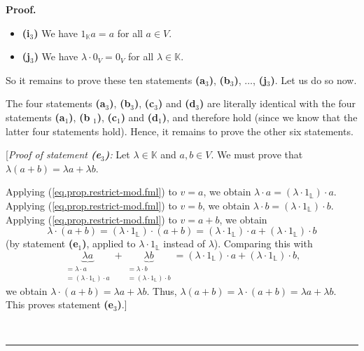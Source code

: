 \documentclass[numbers=enddot,12pt,final,onecolumn,notitlepage]{scrartcl}%
\theoremstyle{definition}
\newenvironment{fineprint}{\begin{small}}{\end{small}}
\newenvironment{proof}[1][Proof]{\noindent\textbf{#1.} }{\ \rule{0.5em}{0.5em}}
\begin{document}
\begin{fineprint}
\begin{proof}
\begin{itemize}
\item \textbf{(i}$_{3}$\textbf{)} We have $1_{\mathbb{K}}a=a$ for all $a\in V$.

\item \textbf{(j}$_{3}$\textbf{)} We have $\lambda\cdot0_{V}=0_{V}$ for all
$\lambda\in\mathbb{K}$.
\end{itemize}

So it remains to prove these ten statements \textbf{(a}$_{3}$\textbf{)},
\textbf{(b}$_{3}$\textbf{)}, $\ldots$, \textbf{(j}$_{3}$\textbf{)}. Let us do
so now.

The four statements \textbf{(a}$_{3}$\textbf{)}, \textbf{(b}$_{3}$\textbf{)},
\textbf{(c}$_{3}$\textbf{)} and \textbf{(d}$_{3}$\textbf{)} are literally
identical with the four statements \textbf{(a}$_{1}$\textbf{)}, \textbf{(b}%
$_{1}$\textbf{)}, \textbf{(c}$_{1}$\textbf{)} and \textbf{(d}$_{1}$\textbf{)},
and therefore hold (since we know that the latter four statements hold).
Hence, it remains to prove the other six statements.

[\textit{Proof of statement \textbf{(e}}$_{3}$\textit{\textbf{)}:} Let
$\lambda\in\mathbb{K}$ and $a,b\in V$. We must prove that $\lambda\left(
a+b\right)  =\lambda a+\lambda b$.

Applying (\ref{eq.prop.restrict-mod.fml}) to $v=a$, we obtain $\lambda\cdot
a=\left(  \lambda\cdot1_{\mathbb{L}}\right)  \cdot a$. Applying
(\ref{eq.prop.restrict-mod.fml}) to $v=b$, we obtain $\lambda\cdot b=\left(
\lambda\cdot1_{\mathbb{L}}\right)  \cdot b$. Applying
(\ref{eq.prop.restrict-mod.fml}) to $v=a+b$, we obtain
\[
\lambda\cdot\left(  a+b\right)  =\left(  \lambda\cdot1_{\mathbb{L}}\right)
\cdot\left(  a+b\right)  =\left(  \lambda\cdot1_{\mathbb{L}}\right)  \cdot
a+\left(  \lambda\cdot1_{\mathbb{L}}\right)  \cdot b
\]
(by statement \textbf{(e}$_{1}$\textbf{)}, applied to $\lambda\cdot
1_{\mathbb{L}}$ instead of $\lambda$). Comparing this with%
\[
\underbrace{\lambda a}_{\substack{=\lambda\cdot a\\=\left(  \lambda
\cdot1_{\mathbb{L}}\right)  \cdot a}}+\underbrace{\lambda b}%
_{\substack{=\lambda\cdot b\\=\left(  \lambda\cdot1_{\mathbb{L}}\right)  \cdot
b}}=\left(  \lambda\cdot1_{\mathbb{L}}\right)  \cdot a+\left(  \lambda
\cdot1_{\mathbb{L}}\right)  \cdot b,
\]
we obtain $\lambda\cdot\left(  a+b\right)  =\lambda a+\lambda b$. Thus,
$\lambda\left(  a+b\right)  =\lambda\cdot\left(  a+b\right)  =\lambda
a+\lambda b$. This proves statement \textbf{(e}$_{3}$\textbf{)}.]


\end{proof}
\end{fineprint}
\end{document}
